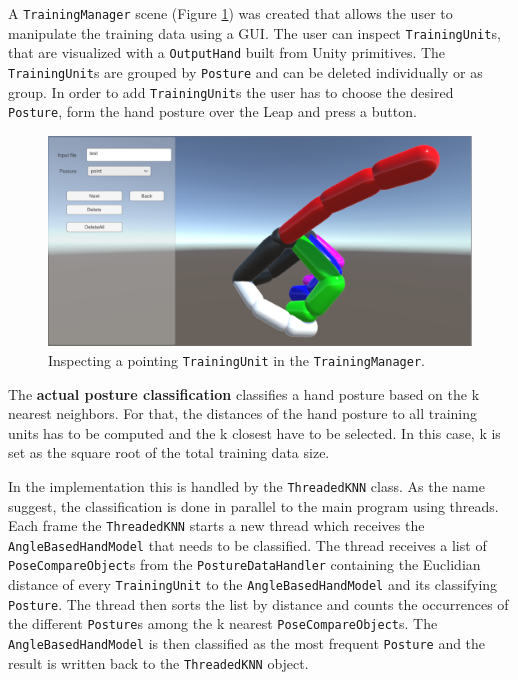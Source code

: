 A \texttt{TrainingManager} scene (Figure \ref{fig:training}) was created that allows the user to manipulate the training data using a GUI. The user can inspect \texttt{TrainingUnit}s, that are visualized with a \texttt{OutputHand} built from Unity primitives. The \texttt{TrainingUnit}s are grouped by \texttt{Posture} and can be deleted individually or as group. In order to add \texttt{TrainingUnit}s the user has to choose the desired \texttt{Posture}, form the hand posture over the Leap and press a button. 

\begin{figure}[h]
\centering
\includegraphics[width=\textwidth]{trianing}
\caption{Inspecting a pointing \texttt{TrainingUnit} in the \texttt{TrainingManager}.}
\label{fig:training}
\end{figure}

The \textbf{actual posture classification} classifies a hand posture based on the k nearest neighbors. For that, the distances of the hand posture to all training units has to be computed and the k closest have to be selected. In this case, k is set as the square root of the total training data size.

In the implementation this is handled by the \texttt{ThreadedKNN} class. As the name suggest, the classification is done in parallel to the main program using threads. Each frame the \texttt{ThreadedKNN} starts a new thread which receives the \texttt{AngleBasedHandModel} that needs to be classified. The thread receives a list of \texttt{PoseCompareObject}s from the \texttt{PostureDataHandler} containing the Euclidian distance of every \texttt{TrainingUnit} to the \texttt{AngleBasedHandModel} and its classifying \texttt{Posture}. The thread then sorts the list by distance and counts the occurrences of the different \texttt{Posture}s among the k nearest \texttt{PoseCompareObject}s. The \texttt{AngleBasedHandModel} is then classified as the most frequent \texttt{Posture} and the result is written back to the \texttt{ThreadedKNN} object.

